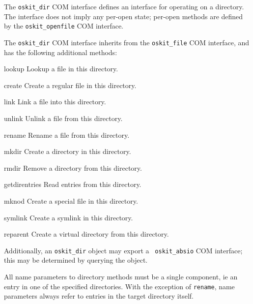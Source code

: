 
	The {\tt oskit_dir} COM interface defines an interface for operating
on a directory.  The interface does not imply any per-open state; per-open
methods are defined by the {\tt oskit_openfile} COM interface.

	The {\tt oskit_dir} COM interface inherits from the {\tt oskit_file} COM
interface, and has the following additional methods:
\begin{csymlist}
\item[lookup]
	Lookup a file in this directory.
\item[create]
	Create a regular file in this directory.
\item[link]
	Link a file into this directory.
\item[unlink]
	Unlink a file from this directory.
\item[rename]
	Rename a file from this directory.
\item[mkdir]
	Create a directory in this directory.
\item[rmdir]
	Remove a directory from this directory.
\item[getdirentries]
	Read entries from this directory.
\item[mknod]
	Create a special file in this directory.
\item[symlink]
	Create a symlink in this directory.
\item[reparent]
	Create a virtual directory from this directory.
\end{csymlist}

	Additionally, an {\tt oskit_dir} object may export a {\tt
oskit_absio} COM interface; this may be determined by querying the
object.

	All name parameters to directory methods must be a single
component, ie an entry in one of the specified directories.  With the
exception of {\tt rename}, name parameters always refer to entries in
the target directory itself.

